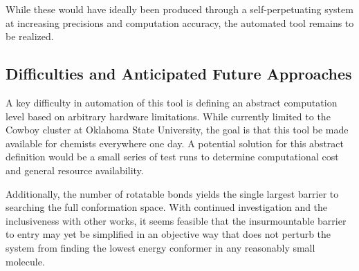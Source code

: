 While these would have ideally been produced through a self-perpetuating system at increasing precisions and computation accuracy, the automated tool remains to be realized.

\subsection{Difficulties and Anticipated Future Approaches}

A key difficulty in automation of this tool is defining an abstract computation level based on arbitrary hardware limitations.
While currently limited to the Cowboy cluster at Oklahoma State University, the goal is that this tool be made available for chemists everywhere one day.
A potential solution for this abstract definition would be a small series of test runs to determine computational cost and general resource availability.

Additionally, the number of rotatable bonds yields the single largest barrier to searching the full conformation space.
With continued investigation and the inclusiveness with other works, it seems feasible that the insurmountable barrier to entry may yet be simplified in an objective way that does not perturb the system from finding the lowest energy conformer in any reasonably small molecule.
